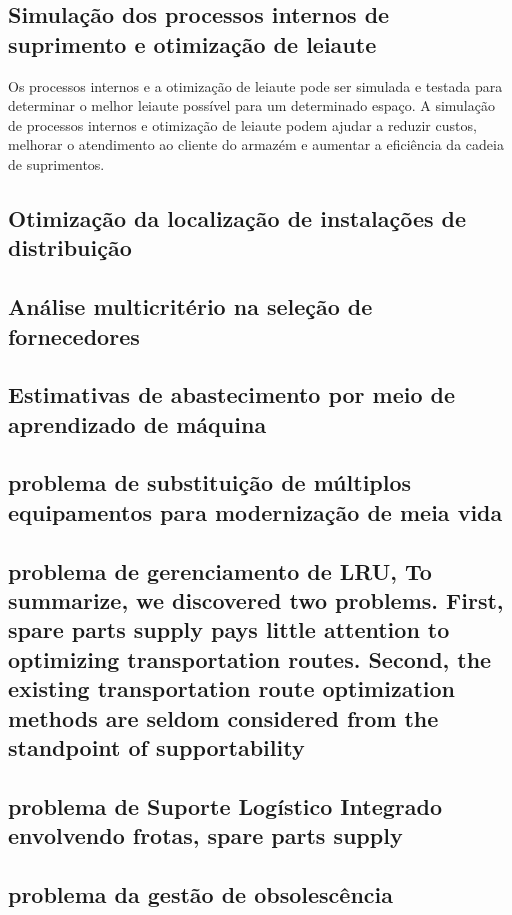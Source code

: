 \documentclass{article}
\begin{document}
\subsection{Simulação dos processos internos de suprimento e otimização de leiaute}

Os processos internos e a otimização de leiaute pode ser simulada e testada para determinar o melhor leiaute possível para um determinado espaço.
A simulação de processos internos e otimização de leiaute podem ajudar a reduzir custos, melhorar o atendimento ao cliente do armazém e aumentar a eficiência da cadeia de suprimentos.

\subsection{Otimização da localização de instalações de distribuição}

\subsection{Análise multicritério na seleção de fornecedores}

\subsection{Estimativas de abastecimento por meio de aprendizado de máquina}

\subsection{problema de substituição de múltiplos equipamentos para modernização de meia vida}

\subsection{problema de gerenciamento de LRU, To summarize, we discovered two problems. First, spare parts supply pays little attention to optimizing transportation routes. Second, the existing transportation route optimization methods are seldom considered from the standpoint of supportability}

\subsection{problema de Suporte Logístico Integrado envolvendo frotas, spare parts supply}

\subsection{problema da gestão de obsolescência}
\end{document}
